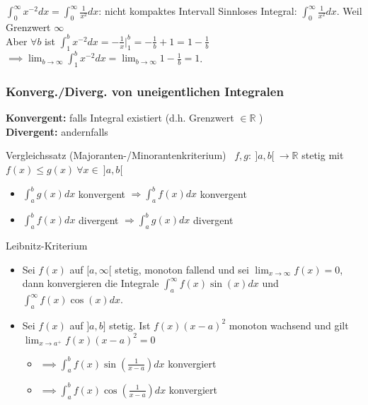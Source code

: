 \documentclass[a4paper]{article}
\newcommand\R{\ensuremath{\mathbb{R}}}
\begin{document}
\begin{bspbox}{$\int_{0}^{\infty} x^{-2}dx =\int_{0}^{\infty} \frac{1}{x^2}dx$: nicht kompaktes Intervall}
  Sinnloses Integral: $\int_{0}^{\infty} \frac{1}{x^2}dx$. Weil Grenzwert $\infty$ \\
  Aber $\forall b$ ist $\int_{1}^{b} x^{-2}dx = -\frac{1}{x}|_1^b = -\frac{1}{b} + 1 = 1 - \frac{1}{b}$ \\
  $\implies \lim_{b \to \infty} \int_{1}^{b} x^{-2}dx = \lim_{b \to \infty} 1 - \frac{1}{b} = 1$.
\end{bspbox}

\subsubsection{Konverg./Diverg. von uneigentlichen Integralen}
\textbf{Konvergent:} falls Integral existiert (d.h. Grenzwert $\in \R$ ) \\
\textbf{Divergent:} andernfalls

\begin{mainbox}{Vergleichssatz \tiny (Majoranten-/Minorantenkriterium)} \
  $f,g: \ ]a,b[ \ \rightarrow \mathbb{R}$ stetig mit $f(x) \leq g(x) \ \forall x \in \ ]a,b[$
  \begin{itemize}[leftmargin=4.5mm, topsep=1pt, parsep=1pt]
    \item $\int_a^b g(x)dx$ konvergent $\Rightarrow \int_a^b f(x)dx$ konvergent
    \item $\int_a^b f(x)dx$ divergent $\Rightarrow \int_a^b g(x)dx$ divergent
  \end{itemize}
\end{mainbox}

\begin{mainbox}{Leibnitz-Kriterium}
  \begin{itemize}[leftmargin=4.5mm, topsep=1pt, parsep=1pt]
    \item[1.] Sei $f(x)$ auf $[a, \infty [$ stetig, monoton fallend und sei $\lim_{x \rightarrow \infty} f(x) = 0$, dann konvergieren die Integrale $\int_a^{\infty} f(x)\sin(x)dx$ und $\int_a^{\infty} f(x)\cos(x)dx$.
    \item[2.] Sei $f(x)$ auf $]a,b]$ stetig. Ist $f(x)(x-a)^2$ monoton wachsend und gilt $\lim_{x \rightarrow a^+} f(x)(x-a)^2 = 0$
      \begin{itemize}[leftmargin=4.5mm, topsep=1pt, parsep=1pt]
        \item $\implies \int_a^b f(x)\sin (\frac{1}{x-a}) dx$ konvergiert 
        \item $\implies \int_a^b f(x)\cos(\frac{1}{x-a}) dx$ konvergiert
      \end{itemize}
  \end{itemize}
\end{mainbox}
\end{document}
